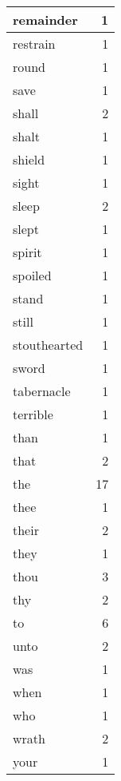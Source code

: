 \begin{center}
\begin{longtable}{l|r}
remainder & 1 \\ \hline
restrain & 1 \\ \hline
round & 1 \\ \hline
save & 1 \\ \hline
shall & 2 \\ \hline
shalt & 1 \\ \hline
shield & 1 \\ \hline
sight & 1 \\ \hline
sleep & 2 \\ \hline
slept & 1 \\ \hline
spirit & 1 \\ \hline
spoiled & 1 \\ \hline
stand & 1 \\ \hline
still & 1 \\ \hline
stouthearted & 1 \\ \hline
sword & 1 \\ \hline
tabernacle & 1 \\ \hline
terrible & 1 \\ \hline
than & 1 \\ \hline
that & 2 \\ \hline
the & 17 \\ \hline
thee & 1 \\ \hline
their & 2 \\ \hline
they & 1 \\ \hline
thou & 3 \\ \hline
thy & 2 \\ \hline
to & 6 \\ \hline
unto & 2 \\ \hline
was & 1 \\ \hline
when & 1 \\ \hline
who & 1 \\ \hline
wrath & 2 \\ \hline
your & 1 \\ \hline
\end{longtable}
\end{center}



\normalsize



